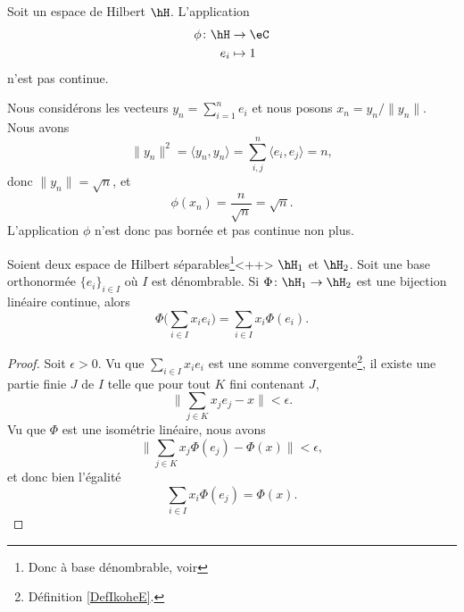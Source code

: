 \begin{example}
    Soit un espace de Hilbert \( \hH\). L'application
    \begin{equation}
        \begin{aligned}
            \phi\colon \hH &\to \eC \\
            e_i&\mapsto 1
        \end{aligned}
    \end{equation}
    n'est pas continue.

    Nous considérons les vecteurs \( y_n=\sum_{i=1}^ne_i\) et nous posons \( x_n=y_n/\| y_n \|\). Nous avons
    \begin{equation}
        \| y_n \|^2=\langle y_n, y_n\rangle =\sum_{i,j}^n\langle e_i, e_j\rangle =n,
    \end{equation}
    donc \( \| y_n \|=\sqrt{ n }\), et 
    \begin{equation}
        \phi(x_n)=\frac{ n }{ \sqrt{ n } }=\sqrt{ n }.
    \end{equation}
    L'application \( \phi\) n'est donc pas bornée et pas continue non plus.
\end{example}

\begin{proposition}     \label{PROPooWHZKooEXEIrV}
    Soient deux espace de Hilbert séparables\footnote{Donc à base dénombrable, voir }<++> \( \hH_1\) et \( \hH_2\). Soit une base orthonormée \( \{ e_i \}_{i\in I}\) où \( I\) est dénombrable. Si \( \Phi\colon \hH_1\to \hH_2\) est une bijection linéaire continue, alors
    \begin{equation}
        \Phi\big( \sum_{i\in I}x_ie_i \big)=\sum_{i\in I}x_i\Phi(e_i).
    \end{equation}
\end{proposition}

\begin{proof}
    Soit \( \epsilon>0\). Vu que \( \sum_{i\in I}x_ie_i\) est une somme convergente\footnote{Définition \ref{DefIkoheE}.}, il existe une partie finie \( J\) de \( I\) telle que pour tout \( K\) fini contenant \( J\),
    \begin{equation}
        \| \sum_{j\in K}x_je_j-x \|<\epsilon.
    \end{equation}
    Vu que \( \Phi\) est une isométrie linéaire, nous avons
    \begin{equation}
        \| \sum_{j\in K}x_j\Phi(e_j)-\Phi(x) \|<\epsilon,
    \end{equation}
    et donc bien l'égalité
    \begin{equation}
        \sum_{i\in I}x_i\Phi(e_j)=\Phi(x).
    \end{equation}
\end{proof}

